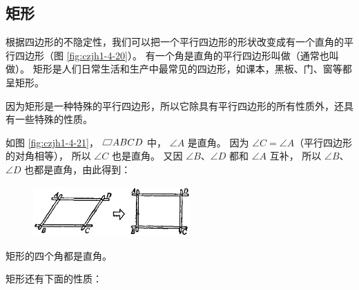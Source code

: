 \subsection{矩形}\label{subsec:czjh1-4-5}

根据四边形的不隐定性，我们可以把一个平行四边形的形状改变成有一个直角的平行四边形（图 \ref{fig:czjh1-4-20}）。
有一个角是直角的平行四边形叫做（通常也叫做）。
矩形是人们日常生活和生产中最常见的四边形，如课本，黑板、门、窗等都呈矩形。


因为矩形是一种特殊的平行四边形，所以它除具有平行四边形的所有性质外，还具有一些特殊的性质。

如图 \ref{fig:czjh1-4-21}， $\pxsbx ABCD$ 中， $\angle A$ 是直角。
因为 $\angle C = \angle A$（平行四边形的对角相等）， 所以 $\angle C$ 也是直角。
又因 $\angle B$、$\angle D$ 都和 $\angle A$ 互补， 所以 $\angle B$、$\angle D$ 也都是直角，由此得到：

\begin{figure}[htbp]
    \centering
    \begin{minipage}[b]{6.5cm}
        \centering
        \includegraphics[width=6cm]{../pic/czjh1-ch4-20.png}
        \caption{}\label{fig:czjh1-4-20}
    \end{minipage}
    \qquad
    \begin{minipage}[b]{4cm}
        \centering
        
        \caption{}\label{fig:czjh1-4-21}
    \end{minipage}
    \qquad
    \begin{minipage}[b]{4cm}
        \centering
        
        \caption{}\label{fig:czjh1-4-22}
    \end{minipage}
\end{figure}


\begin{dingli}[矩形性质定理1]
    矩形的四个角都是直角。
\end{dingli}

矩形还有下面的性质：


